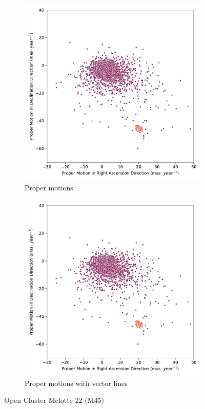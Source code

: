 \documentclass[11pt, a4paper, english]{book}
\begin{document}
\begin{figure}[htbp]
  \centering
  \begin{subfigure}[t]{0.45\textwidth}
    \centering
    \includegraphics[width=\textwidth]{../figures/pm_melotte_22.pdf}
    \caption{Proper motions}
    \label{fig:pm_melotte_22}
  \end{subfigure}
  \hfill
  \begin{subfigure}[t]{0.45\textwidth}
    \centering
    \includegraphics[width=\textwidth]{../figures/pm_melotte_22.pdf}
    \caption{Proper motions with vector lines}
    \label{fig:pm_vec_melotte_22}
  \end{subfigure}
  \caption{Open Cluster Melotte 22 (M45)}
\end{figure}
\end{document}
